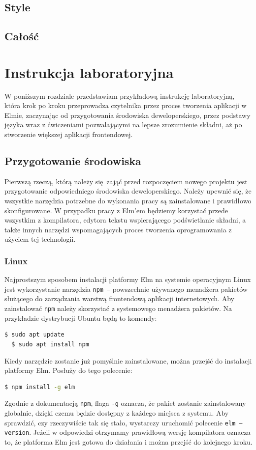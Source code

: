 \documentclass[twoside,a4paper]{report}
\begin{document}
\section{Style}

\section{Całość}


\chapter{Instrukcja laboratoryjna}
W poniższym rozdziale przedstawiam przykładową instrukcję laboratoryjną, która krok po kroku przeprowadza czytelnika przez proces tworzenia aplikacji w Elmie, zaczynając od przygotowania środowiska deweloperskiego, przez podstawy języka wraz z ćwiczeniami pozwalającymi na lepsze zrozumienie składni, aż po stworzenie większej aplikacji frontendowej.

\section{Przygotowanie środowiska}
Pierwszą rzeczą, którą należy się zająć przed rozpoczęciem nowego projektu jest przygotowanie odpowiedniego środowiska deweloperskiego.
Należy upewnić się, że wszystkie narzędzia potrzebne do wykonania pracy są zainstalowane i prawidłowo skonfigurowane.
W przypadku pracy z Elm'em będziemy korzystać przede wszystkim z kompilatora, edytora tekstu wspierającego podświetlanie składni, a także innych narzędzi wspomagających proces tworzenia oprogramowania z użyciem tej technologii.

\subsection{Linux}
Najprostszym sposobem instalacji platformy Elm na systemie operacyjnym Linux jest wykorzystanie narzędzia \texttt{npm}~-- powszechnie używanego menadżera pakietów służącego do zarządzania warstwą frontendową aplikacji internetowych.
Aby zainstalować \texttt{npm} należy skorzystać z systemowego menadżera pakietów.
Na przykładzie dystrybucji Ubuntu będą to komendy:
\begin{lstlisting}[language=bash]
  $ sudo apt update
  $ sudo apt install npm
\end{lstlisting}
Kiedy narzędzie zostanie już pomyślnie zainstalowane, można przejść do instalacji platformy Elm.
Posłuży do tego polecenie:
\begin{lstlisting}[language=bash]
  $ npm install -g elm
\end{lstlisting}
Zgodnie z dokumentacją \texttt{npm}\cite{npmdocs}, flaga \texttt{-g} oznacza, że pakiet zostanie zainstalowany globalnie, dzięki czemu będzie dostępny z każdego miejsca z systemu.
Aby sprawdzić, czy rzeczywiście tak się stało, wystarczy uruchomić polecenie \texttt{elm --version}.
Jeżeli w odpowiedzi otrzymamy prawidłową wersję kompilatora oznacza to, że platforma Elm jest gotowa do działania i można przejść do kolejnego kroku.
\end{document}

